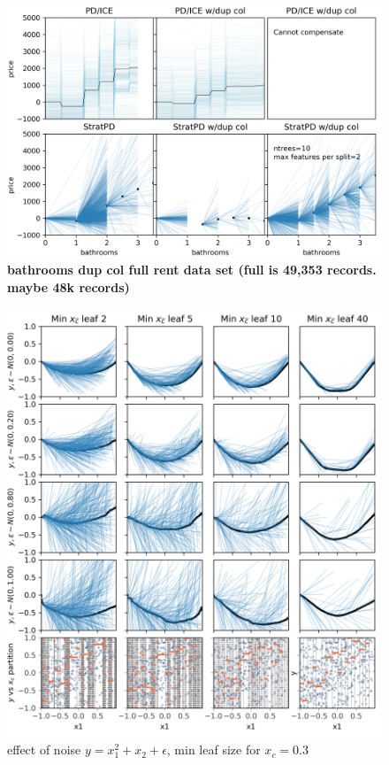 \documentclass[12pt]{article}
\begin{document}
\begin{figure}[htbp]
\begin{center}
\includegraphics[scale=0.6]{images/bathrooms_vs_price_dup.png}
\caption{{\bf  bathrooms dup col full rent data set (full is 49,353 records. maybe 48k records)}}
\label{fig:bathss_dup}
\end{center}
\end{figure}

\begin{figure}[htbp]
\begin{center}
\includegraphics[scale=0.7]{images/meta_additivity_noise.png}
\caption{effect of noise $y = x_1^2 + x_2 + \epsilon$, min leaf size for $x_c=0.3$}
\label{fig:meta_noise}
\end{center}
\end{figure}
\end{document}

